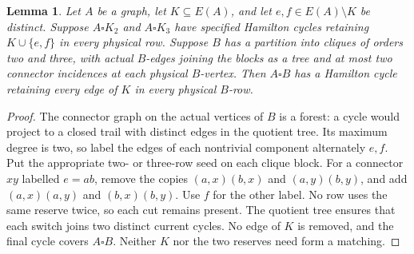 \documentclass[11pt]{article}
\newtheorem{lemma}[theorem]{Lemma}
\theoremstyle{remark}
\numberwithin{equation}{section}
\numberwithin{table}{section}
\begin{document}
\begin{lemma}\label{lem:clique-block-product}
Let $A$ be a graph, let $K\subseteq E(A)$, and let
$e,f\in E(A)\setminus K$ be distinct. Suppose $A\square K_2$ and
$A\square K_3$ have specified Hamilton cycles retaining
$K\cup\{e,f\}$ in every physical row. Suppose $B$ has a partition
into cliques of orders two and three, with actual $B$-edges joining
the blocks as a tree and at most two connector incidences at each
physical $B$-vertex. Then $A\square B$ has a Hamilton cycle retaining
every edge of $K$ in every physical $B$-row.
\end{lemma}
\begin{proof}
The connector graph on the actual vertices of $B$ is a forest: a cycle
would project to a closed trail with distinct edges in the quotient tree.
Its maximum degree is two, so label the edges of each nontrivial component
alternately $e,f$. Put the appropriate two- or three-row seed on each
clique block. For a connector $xy$ labelled $e=ab$, remove the copies
$(a,x)(b,x)$ and $(a,y)(b,y)$, and add $(a,x)(a,y)$ and $(b,x)(b,y)$.
Use $f$ for the other label. No row uses the same reserve twice, so each
cut remains present. The quotient tree ensures that each switch joins
two distinct current cycles. No edge of $K$ is removed, and the final
cycle covers $A\square B$. Neither $K$ nor the two reserves need form
a matching.
\end{proof}
\end{document}
